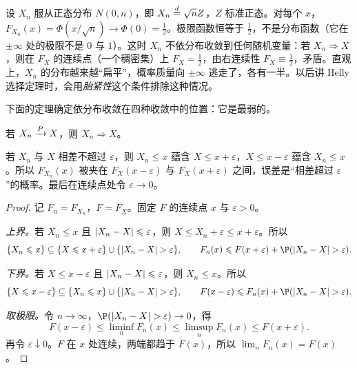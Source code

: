 \begin{example}\label{ex:convergence:escape}
设 $X_n$ 服从正态分布 $N(0,n)$，即 $X_n\stackrel{d}{=}\sqrt nZ$，$Z$ 标准正态。对每个 $x$，$F_{X_n}(x)=\Phi(x/\sqrt n)\to\Phi(0)=\frac12$。极限函数恒等于 $\frac12$，不是分布函数（它在 $\pm\infty$ 处的极限不是 $0$ 与 $1$）。这时 $X_n$ 不依分布收敛到任何随机变量：若 $X_n\Rightarrow X$，则在 $F_X$ 的连续点（一个稠密集）上 $F_X=\frac12$，由右连续性 $F_X\equiv\frac12$，矛盾。直观上，$X_n$ 的分布越来越“扁平”，概率质量向 $\pm\infty$ 逃走了，各有一半。以后讲 Helly 选择定理时，会用\emph{胎紧性}这个条件排除这种情况。
\end{example}

下面的定理确定依分布收敛在四种收敛中的位置：它是最弱的。

\begin{theorem}[依概率收敛蕴含依分布收敛]\label{thm:convergence:p-implies-d}
若 $X_n\xrightarrow{P} X$，则 $X_n\Rightarrow X$。
\end{theorem}

\begin{remark}[证明思路]
若 $X_n$ 与 $X$ 相差不超过 $\varepsilon$，则 $X_n\leqslant x$ 蕴含 $X\leqslant x+\varepsilon$，$X\leqslant x-\varepsilon$ 蕴含 $X_n\leqslant x$。所以 $F_{X_n}(x)$ 被夹在 $F_X(x-\varepsilon)$ 与 $F_X(x+\varepsilon)$ 之间，误差是“相差超过 $\varepsilon$”的概率。最后在连续点处令 $\varepsilon\to0$。
\end{remark}

\begin{proof}
记 $F_n=F_{X_n}$，$F=F_X$。固定 $F$ 的连续点 $x$ 与 $\varepsilon>0$。

\emph{上界。}若 $X_n\leqslant x$ 且 $\lvert X_n-X\rvert\leqslant\varepsilon$，则 $X\leqslant X_n+\varepsilon\leqslant x+\varepsilon$。所以
\[
\{X_n\leqslant x\}\subseteq\{X\leqslant x+\varepsilon\}\cup\{\abs{X_n-X}>\varepsilon\},\qquad F_n(x)\leqslant F(x+\varepsilon)+\P(\abs{X_n-X}>\varepsilon).
\]

\emph{下界。}若 $X\leqslant x-\varepsilon$ 且 $\lvert X_n-X\rvert\leqslant\varepsilon$，则 $X_n\leqslant x$。所以
\[
\{X\leqslant x-\varepsilon\}\subseteq\{X_n\leqslant x\}\cup\{\abs{X_n-X}>\varepsilon\},\qquad F(x-\varepsilon)\leqslant F_n(x)+\P(\abs{X_n-X}>\varepsilon).
\]

\emph{取极限。}令 $n\to\infty$，$\P(\abs{X_n-X}>\varepsilon)\to0$，得
\[
F(x-\varepsilon)\leqslant\liminf_nF_n(x)\leqslant\limsup_nF_n(x)\leqslant F(x+\varepsilon).
\]
再令 $\varepsilon\downarrow0$。$F$ 在 $x$ 处连续，两端都趋于 $F(x)$，所以 $\lim_nF_n(x)=F(x)$。
\end{proof}

